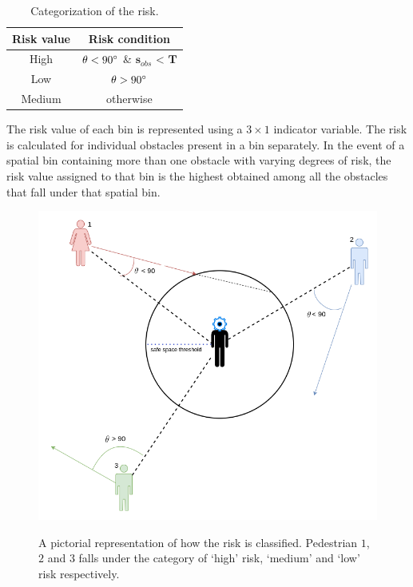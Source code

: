 \begin{table}[htbp]
    \begin{center}
        \renewcommand{\arraystretch}{1.3}
        \begin{tabular}{|c|c|}
            \hline
            \textbf{Risk value}& \textbf{Risk condition} \\
            \hline
            High & $\theta < 90\degree$ \&  $\mathbf{s}_{obs}$ < $\mathbf{T}$   \\
            
            Low & $\theta > 90\degree$\\
            
            Medium & otherwise \\
            \hline
        \end{tabular}
    	 \caption{Categorization of the risk.}
		\label{risk-categorization-table}
    \end{center}

\end{table}
\par
The risk value of each bin is represented using a $3 \times 1$ indicator variable. The risk is calculated for individual obstacles present in a bin separately. In the event of a spatial bin containing more than one obstacle with varying degrees of risk, the risk value assigned to that bin is the highest obtained among all the obstacles that fall under that spatial bin.
\begin{figure}[!htbp]
	\centering
	\includegraphics[width=\linewidth]{figures/risk_picture.png}
    \label{fig:risk-calculation}
    \caption{A pictorial representation of how the risk is classified. Pedestrian $1$, $2$ and $3$ falls under the category of `high' risk, `medium' and `low' risk respectively.}
\end{figure}


